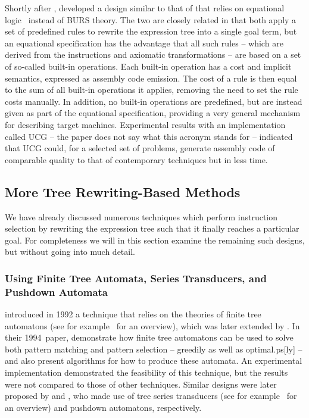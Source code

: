 {Shortly after \citeauthor{Geigerich1988}, \textcite{Hatcher1991} developed a
design similar to that of \citeauthor{Pelegri-Llopart1988} that relies on
\gls{equational logic}~\cite{ODonnell1985} instead of \gls{BURS} theory.
%
The two
are closely related in that both apply a set of predefined \glspl{rule} to
rewrite the \gls{expression tree} into a single goal term, but an equational
specification has the advantage that all such \glspl{rule} -- which are derived
from the \glspl{instruction} and axiomatic transformations -- are based on a set
of so-called \glspl{built-in operation}.
%
Each \gls{built-in operation} has a
cost and implicit semantics, expressed as \gls{assembly code} emission.
%
The cost
of a \gls{rule} is then equal to the sum of all \glspl{built-in operation} it
applies, removing the need to set the \gls{rule} costs manually.
%
In addition, no
\glspl{built-in operation} are predefined, but are instead given as part of the
equational specification, providing a very general mechanism for describing
\glspl{target machine}.
%
Experimental results with an implementation called
\gls{UCG} -- the paper does not say what this acronym stands for -- indicated
that \gls{UCG} could, for a selected set of problems, generate \gls{assembly
  code} of comparable quality to that of contemporary techniques but in less
time.


\subsection{More Tree Rewriting-Based Methods}

We have already discussed numerous techniques which perform \gls{instruction
  selection} by rewriting the \gls{expression tree} such that it finally reaches a
particular goal.
%
For completeness we will in this section examine the remaining
such designs, but without going into much detail.


\subsubsection{Using Finite Tree Automata, Series Transducers, and Pushdown
  Automata}

\textcite{Emmelmann1992a} introduced in 1992 a technique that relies on the
theories of \glspl{finite tree automaton} (see for example~\cite{Gecseg1984} for
an overview), which was later extended by \textcite{Ferdinand1994}.
%
In their
1994~paper, \citeauthor{Ferdinand1994} demonstrate how \glspl{finite tree
  automaton} can be used to solve both \gls{pattern matching} and \gls{pattern
  selection} -- greedily as well as \gls{optimal.ps}[ly] -- and also
present algorithms for how to produce these automata.
%
An experimental
implementation demonstrated the feasibility of this technique, but the results
were not compared to those of other techniques.
%
Similar designs were later
proposed by \textcite{Borchardt2004} and \textcite{Janousek2014}, who made use
of \glspl{tree series transducer} (see for example~\cite{Engelfriet2001} for an
overview) and \glspl{pushdown automaton}, respectively.


}
